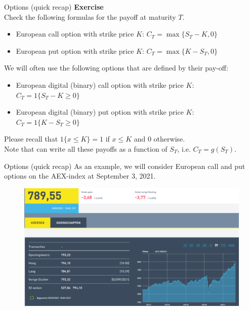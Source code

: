 \documentclass[pdf, handout]{beamer}
\begin{document}
\begin{frame}{Options (quick recap)}
\textbf{Exercise}\\ Check the following formulas for the payoff at maturity $T$.
\begin{itemize}
\item European call option with strike price $K$:  $C_T=\max\{ S_T -K , 0\}$
\item European put option with strike price $K$:  $C_T=\max\{ K-S_T  , 0\}$
\end{itemize}
\vspace{.25cm}
We will often use the following options that are defined by their pay-off:
\begin{itemize}
\item European digital (binary) call option with strike price $K$:  $C_T=1\{ S_T -K \geq 0\}$
\item European digital (binary) put option with strike price $K$:  $C_T=1\{ K -S_T \geq 0\}$
\end{itemize}
Please recall that $1\{ x\leq K\} =1$ if $x\leq K$ and 0 otherwise.
\\ \vspace{.5cm}
Note that can write all these payoffs as a function of $S_T$, i.e. $C_T = g(S_T)$.
\end{frame}


\begin{frame}{Options (quick recap)}
As an example, we will consider European call and put options on the AEX-index at September 3, 2021. 
\begin{figure}
\includegraphics[width=1\textwidth]{AEX}
\end{figure}
\end{frame}
\end{document}
